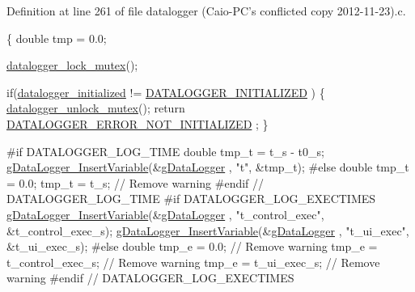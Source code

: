Definition at line 261 of file datalogger (\-Caio-\/\-P\-C's conflicted copy 2012-\/11-\/23).\-c.


\begin{DoxyCode}
\{
    \textcolor{keywordtype}{double} tmp = 0.0;

    \hyperlink{datalogger_01_07Caio-PC's_01conflicted_01copy_012012-11-23_08_8c_a54b06d9395b2e370a5a72beb7f9524b2}{datalogger\_lock\_mutex}();

    \textcolor{keywordflow}{if}(\hyperlink{datalogger_01_07Caio-PC's_01conflicted_01copy_012012-11-23_08_8c_a35e8fbe04b90452afdc3c1be16ff6187}{datalogger\_initialized} != \hyperlink{datalogger_01_07Caio-PC's_01conflicted_01copy_012012-11-23_08_8h_a684c343d340004b77ca2b782934c96ca}{DATALOGGER\_INITIALIZED}
      )
    \{
        \hyperlink{datalogger_01_07Caio-PC's_01conflicted_01copy_012012-11-23_08_8c_a85453211c0c809083c36cc56b275aeeb}{datalogger\_unlock\_mutex}();
        \textcolor{keywordflow}{return} \hyperlink{datalogger_01_07Caio-PC's_01conflicted_01copy_012012-11-23_08_8h_a60df7fe0e61b757ad6a9db106b0eb43e}{DATALOGGER\_ERROR\_NOT\_INITIALIZED}
      ;
    \}

\textcolor{preprocessor}{    #if DATALOGGER\_LOG\_TIME}
\textcolor{preprocessor}{}    \textcolor{keywordtype}{double} tmp\_t = t\_s - t0\_s;
    \hyperlink{gdatalogger_8c_a32674e7c2afa8b78e99a0070cf4bcaf9}{gDataLogger\_InsertVariable}(&\hyperlink{datalogger_01_07Caio-PC's_01conflicted_01copy_012012-11-23_08_8c_abe3b9c2c4e21e79c7b046b5986d13acc}{gDataLogger}
      , \textcolor{stringliteral}{"t"}, &tmp\_t);
\textcolor{preprocessor}{    #else}
\textcolor{preprocessor}{}    \textcolor{keywordtype}{double} tmp\_t = 0.0;
    tmp\_t = t\_s; \textcolor{comment}{// Remove warning}
\textcolor{preprocessor}{    #endif // DATALOGGER\_LOG\_TIME}
\textcolor{preprocessor}{}
\textcolor{preprocessor}{    #if DATALOGGER\_LOG\_EXECTIMES}
\textcolor{preprocessor}{}    \hyperlink{gdatalogger_8c_a32674e7c2afa8b78e99a0070cf4bcaf9}{gDataLogger\_InsertVariable}(&\hyperlink{datalogger_01_07Caio-PC's_01conflicted_01copy_012012-11-23_08_8c_abe3b9c2c4e21e79c7b046b5986d13acc}{gDataLogger}
      , \textcolor{stringliteral}{"t\_control\_exec"}, &t\_control\_exec\_s);
    \hyperlink{gdatalogger_8c_a32674e7c2afa8b78e99a0070cf4bcaf9}{gDataLogger\_InsertVariable}(&\hyperlink{datalogger_01_07Caio-PC's_01conflicted_01copy_012012-11-23_08_8c_abe3b9c2c4e21e79c7b046b5986d13acc}{gDataLogger}
      , \textcolor{stringliteral}{"t\_ui\_exec"}, &t\_ui\_exec\_s);
\textcolor{preprocessor}{    #else}
\textcolor{preprocessor}{}    \textcolor{keywordtype}{double} tmp\_e = 0.0; \textcolor{comment}{// Remove warning}
    tmp\_e = t\_control\_exec\_s; \textcolor{comment}{// Remove warning}
    tmp\_e = t\_ui\_exec\_s; \textcolor{comment}{// Remove warning}
\textcolor{preprocessor}{    #endif // DATALOGGER\_LOG\_EXECTIMES}
\textcolor{preprocessor}{}


\end{DoxyCode}
